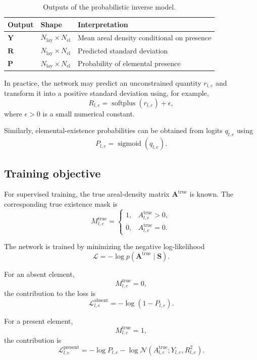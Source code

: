 \documentclass[11pt,a4paper]{article}
\begin{document}
\begin{table}[h]
\centering
\begin{tabular}{lll}
\toprule
Output & Shape & Interpretation \\
\midrule
$\bm{Y}$ &
$N_{\mathrm{lay}}\times N_{\mathrm{el}}$ &
Mean areal density conditional on presence \\
$\bm{R}$ &
$N_{\mathrm{lay}}\times N_{\mathrm{el}}$ &
Predicted standard deviation \\
$\bm{P}$ &
$N_{\mathrm{lay}}\times N_{\mathrm{el}}$ &
Probability of elemental presence \\
\bottomrule
\end{tabular}
\caption{Outputs of the probabilistic inverse model.}
\label{tab:outputs}
\end{table}

In practice, the network may predict an unconstrained quantity
$r_{l,e}$ and transform it into a positive standard deviation using, for example,
\[
R_{l,e}
=
\operatorname{softplus}(r_{l,e})+\epsilon,
\]
where $\epsilon>0$ is a small numerical constant.

Similarly, elemental-existence probabilities can be obtained from logits $q_{l,e}$ using
\[
P_{l,e}
=
\operatorname{sigmoid}(q_{l,e}).
\]

\subsection{Training objective}

For supervised training, the true areal-density matrix
$\bm{A}^{\mathrm{true}}$ is known. The corresponding true existence mask is
\[
M_{l,e}^{\mathrm{true}}
=
\begin{cases}
1, & A_{l,e}^{\mathrm{true}}>0,\\
0, & A_{l,e}^{\mathrm{true}}=0.
\end{cases}
\]

The network is trained by minimizing the negative log-likelihood
\[
\mathcal{L}
=
-\log
p\left(
\bm{A}^{\mathrm{true}}
\mid
\bm{S}
\right).
\]

For an absent element,
\[
M_{l,e}^{\mathrm{true}}=0,
\]
the contribution to the loss is
\[
\boxed{
\mathcal{L}_{l,e}^{\mathrm{absent}}
=
-\log(1-P_{l,e}).
}
\]

For a present element,
\[
M_{l,e}^{\mathrm{true}}=1,
\]
the contribution is
\[
\mathcal{L}_{l,e}^{\mathrm{present}}
=
-\log P_{l,e}
-
\log
\mathcal{N}
\left(
A_{l,e}^{\mathrm{true}};
Y_{l,e},
R_{l,e}^{2}
\right).
\]
\end{document}

